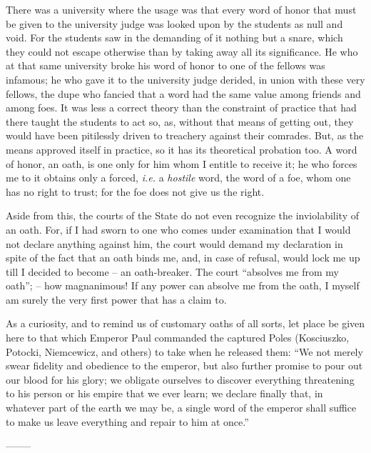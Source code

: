 \documentclass[12pt,a4paper]{book}
\begin{document}
There was a university where the usage was that every word of honor that must 
be given to the university judge was looked upon by the students as null and 
void. For the students saw in the demanding of it nothing but a snare, which 
they could not escape otherwise than by taking away all its significance. He 
who at that same university broke his word of honor to one of the fellows was 
infamous; he who gave it to the university judge derided, in union with these 
very fellows, the dupe who fancied that a word had the same value among 
friends and among foes. It was less a correct theory than the constraint of 
practice that had there taught the students to act so, as, without that means 
of getting out, they would have been pitilessly driven to treachery against 
their comrades. But, as the means approved itself in practice, so it has its 
theoretical probation too. A word of honor, an oath, is one only for him whom 
I entitle to receive it; he who forces me to it obtains only a forced, 
\textit{i.e.} a \textit{hostile} word, the word of a foe, whom one has no 
right to trust; for the foe does not give us the right.

Aside from this, the courts of the State do not even recognize the 
inviolability of an oath. For, if I had sworn to one who comes under 
examination that I would not declare anything against him, the court would 
demand my declaration in spite of the fact that an oath binds me, and, in case 
of refusal, would lock me up till I decided to become -- an oath-breaker. The 
court ``absolves me from my oath''; -- how magnanimous! If any power can 
absolve me from the oath, I myself am surely the very first power that has a 
claim to.

As a curiosity, and to remind us of customary oaths of all sorts, let place be 
given here to that which Emperor Paul commanded the captured Poles 
(Kosciuszko, Potocki, Niemcewicz, and others) to take when he released them: 
``We not merely swear fidelity and obedience to the emperor, but also further 
promise to pour out our blood for his glory; we obligate ourselves to discover 
everything threatening to his person or his empire that we ever learn; we 
declare finally that, in whatever part of the earth we may be, a single word 
of the emperor shall suffice to make us leave everything and repair to him at 
once.''

\begin{center}
--------\end{center}
\end{document}
